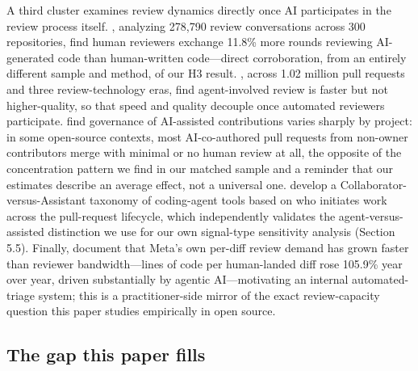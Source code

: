 \documentclass[12pt]{article}
\begin{document}
A third cluster examines review dynamics directly once AI participates in
the review process itself. \citet{zhong2026synergy}, analyzing 278,790
review conversations across 300 repositories, find human reviewers
exchange 11.8\% more rounds reviewing AI-generated code than
human-written code---direct corroboration, from an entirely different
sample and method, of our H3 result. \citet{zhong2026generations}, across
1.02 million pull requests and three review-technology eras, find
agent-involved review is faster but not higher-quality, so that speed and
quality decouple once automated reviewers participate.
\citet{gao2026autopilot} find governance of AI-assisted contributions
varies sharply by project: in some open-source contexts, most
AI-co-authored pull requests from non-owner contributors merge with
minimal or no human review at all, the opposite of the concentration
pattern we find in our matched sample and a reminder that our estimates
describe an average effect, not a universal one. \citet{chung2026collaborator}
develop a Collaborator-versus-Assistant taxonomy of coding-agent tools
based on who initiates work across the pull-request lifecycle, which
independently validates the agent-versus-assisted distinction we use for
our own signal-type sensitivity analysis (Section 5.5). Finally,
\citet{adams2026radar} document that Meta's own per-diff review demand
has grown faster than reviewer bandwidth---lines of code per human-landed
diff rose 105.9\% year over year, driven substantially by agentic
AI---motivating an internal automated-triage system; this is a
practitioner-side mirror of the exact review-capacity question this paper
studies empirically in open source.

\subsection{The gap this paper fills}
\end{document}
